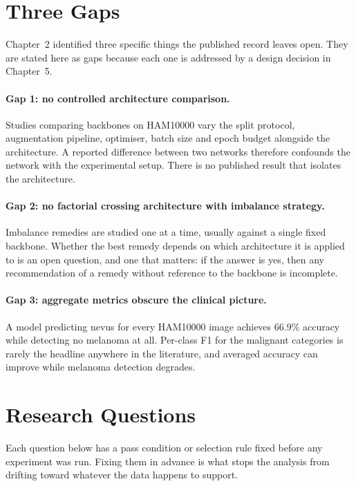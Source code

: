\section{Three Gaps}
\label{sec:gaps}

Chapter~2 identified three specific things the published record leaves open. They are
stated here as gaps because each one is addressed by a design decision in Chapter~5.

\paragraph{Gap 1: no controlled architecture comparison.}
Studies comparing backbones on HAM10000 vary the split protocol, augmentation pipeline,
optimiser, batch size and epoch budget alongside the architecture. A reported difference
between two networks therefore confounds the network with the experimental setup. There
is no published result that isolates the architecture.

\paragraph{Gap 2: no factorial crossing architecture with imbalance strategy.}
Imbalance remedies are studied one at a time, usually against a single fixed backbone.
Whether the best remedy depends on which architecture it is applied to is an open
question, and one that matters: if the answer is yes, then any recommendation of a
remedy without reference to the backbone is incomplete.

\paragraph{Gap 3: aggregate metrics obscure the clinical picture.}
A model predicting nevus for every HAM10000 image achieves 66.9\% accuracy while
detecting no melanoma at all. Per-class F1 for the malignant categories is rarely the
headline anywhere in the literature, and averaged accuracy can improve while melanoma
detection degrades.

\section{Research Questions}
\label{sec:rqs}

Each question below has a pass condition or selection rule fixed before any experiment
was run. Fixing them in advance is what stops the analysis from drifting toward whatever
the data happens to support.

